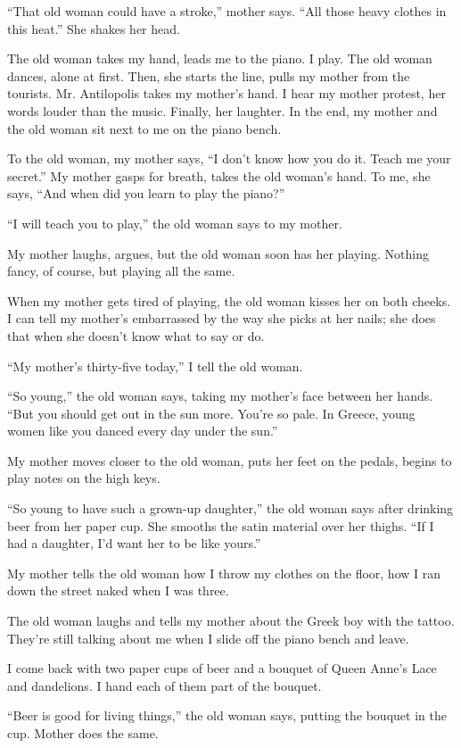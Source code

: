 \documentclass[
]{article}
\begin{document}
``That old woman could have a stroke,'' mother says. ``All those heavy
clothes in this heat.'' She shakes her head.

The old woman takes my hand, leads me to the piano. I play. The old
woman dances, alone at first. Then, she starts the line, pulls my mother
from the tourists. Mr. Antilopolis takes my mother's hand. I hear my
mother protest, her words louder than the music. Finally, her laughter.
In the end, my mother and the old woman sit next to me on the piano
bench.

To the old woman, my mother says, ``I don't know how you do it. Teach me
your secret.'' My mother gasps for breath, takes the old woman's hand.
To me, she says, ``And when did you learn to play the piano?''

``I will teach you to play,'' the old woman says to my mother.

My mother laughs, argues, but the old woman soon has her playing.
Nothing fancy, of course, but playing all the same.

When my mother gets tired of playing, the old woman kisses her on both
cheeks. I can tell my mother's embarrassed by the way she picks at her
nails; she does that when she doesn't know what to say or do.

``My mother's thirty-five today,'' I tell the old woman.

``So young,'' the old woman says, taking my mother's face between her
hands. ``But you should get out in the sun more. You're so pale. In
Greece, young women like you danced every day under the sun.''

My mother moves closer to the old woman, puts her feet on the pedals,
begins to play notes on the high keys.

``So young to have such a grown-up daughter,'' the old woman says after
drinking beer from her paper cup. She smooths the satin material over
her thighs. ``If I had a daughter, I'd want her to be like yours.''

My mother tells the old woman how I throw my clothes on the floor, how I
ran down the street naked when I was three.

The old woman laughs and tells my mother about the Greek boy with the
tattoo. They're still talking about me when I slide off the piano bench
and leave.

I come back with two paper cups of beer and a bouquet of Queen Anne's
Lace and dandeli­ons. I hand each of them part of the bouquet.

``Beer is good for living things,'' the old woman says, putting the
bouquet in the cup. Mother does the same.
\end{document}
